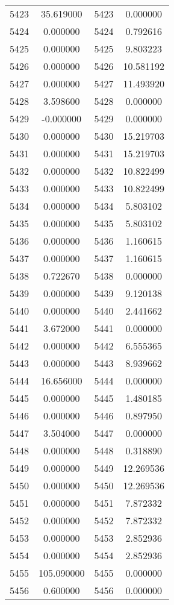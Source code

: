 \documentclass[12pt]{article}
\begin{document}
\begin{longtable}{@{}cccc@{}}
5423 & 35.619000 & 5423 & 0.000000 \\
5424 & 0.000000 & 5424 & 0.792616 \\
5425 & 0.000000 & 5425 & 9.803223 \\
5426 & 0.000000 & 5426 & 10.581192 \\
5427 & 0.000000 & 5427 & 11.493920 \\
5428 & 3.598600 & 5428 & 0.000000 \\
5429 & -0.000000 & 5429 & 0.000000 \\
5430 & 0.000000 & 5430 & 15.219703 \\
5431 & 0.000000 & 5431 & 15.219703 \\
5432 & 0.000000 & 5432 & 10.822499 \\
5433 & 0.000000 & 5433 & 10.822499 \\
5434 & 0.000000 & 5434 & 5.803102 \\
5435 & 0.000000 & 5435 & 5.803102 \\
5436 & 0.000000 & 5436 & 1.160615 \\
5437 & 0.000000 & 5437 & 1.160615 \\
5438 & 0.722670 & 5438 & 0.000000 \\
5439 & 0.000000 & 5439 & 9.120138 \\
5440 & 0.000000 & 5440 & 2.441662 \\
5441 & 3.672000 & 5441 & 0.000000 \\
5442 & 0.000000 & 5442 & 6.555365 \\
5443 & 0.000000 & 5443 & 8.939662 \\
5444 & 16.656000 & 5444 & 0.000000 \\
5445 & 0.000000 & 5445 & 1.480185 \\
5446 & 0.000000 & 5446 & 0.897950 \\
5447 & 3.504000 & 5447 & 0.000000 \\
5448 & 0.000000 & 5448 & 0.318890 \\
5449 & 0.000000 & 5449 & 12.269536 \\
5450 & 0.000000 & 5450 & 12.269536 \\
5451 & 0.000000 & 5451 & 7.872332 \\
5452 & 0.000000 & 5452 & 7.872332 \\
5453 & 0.000000 & 5453 & 2.852936 \\
5454 & 0.000000 & 5454 & 2.852936 \\
5455 & 105.090000 & 5455 & 0.000000 \\
5456 & 0.600000 & 5456 & 0.000000 \\

\end{longtable}
\end{document}
